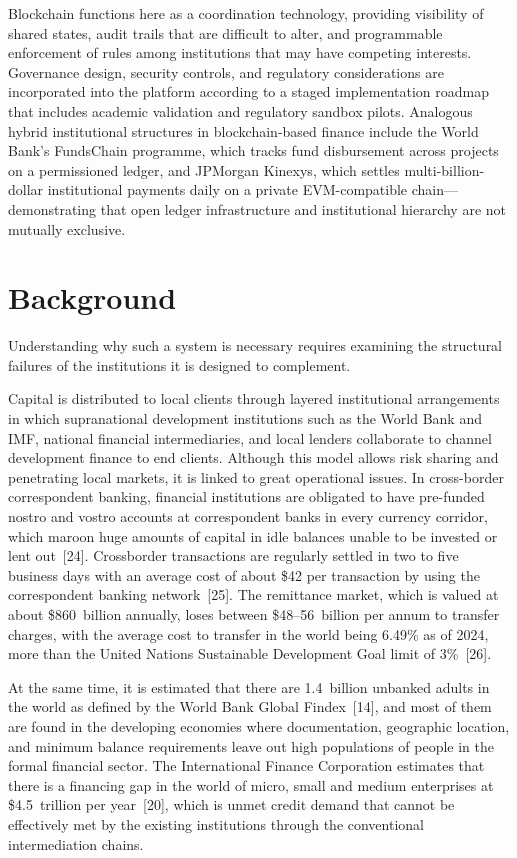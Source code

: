 \documentclass[12pt,a4paper]{report}
\begin{document}
Blockchain functions here as a coordination technology, providing visibility of shared states, audit trails that are difficult to alter, and programmable enforcement of rules among institutions that may have competing interests. Governance design, security controls, and regulatory considerations are incorporated into the platform according to a staged implementation roadmap that includes academic validation and regulatory sandbox pilots. Analogous hybrid institutional structures in blockchain-based finance include the World Bank's FundsChain programme, which tracks fund disbursement across projects on a permissioned ledger, and JPMorgan Kinexys, which settles multi-billion-dollar institutional payments daily on a private EVM-compatible chain---demonstrating that open ledger infrastructure and institutional hierarchy are not mutually exclusive.

\section{Background}

Understanding why such a system is necessary requires examining the structural failures of the institutions it is designed to complement.

Capital is distributed to local clients through layered institutional arrangements in which supranational development institutions such as the World Bank and IMF, national financial intermediaries, and local lenders collaborate to channel development finance to end clients. Although this model allows risk sharing and penetrating local markets, it is linked to great operational issues. In cross-border correspondent banking, financial institutions are obligated to have pre-funded nostro and vostro accounts at correspondent banks in every currency corridor, which maroon huge amounts of capital in idle balances unable to be invested or lent out~[24]. Crossborder transactions are regularly settled in two to five business days with an average cost of about \$42 per transaction by using the correspondent banking network~[25]. The remittance market, which is valued at about \$860~billion annually, loses between \$48--56~billion per annum to transfer charges, with the average cost to transfer in the world being 6.49\% as of 2024, more than the United Nations Sustainable Development Goal limit of 3\%~[26].

At the same time, it is estimated that there are 1.4~billion unbanked adults in the world as defined by the World Bank Global Findex~[14], and most of them are found in the developing economies where documentation, geographic location, and minimum balance requirements leave out high populations of people in the formal financial sector. The International Finance Corporation estimates that there is a financing gap in the world of micro, small and medium enterprises at \$4.5~trillion per year~[20], which is unmet credit demand that cannot be effectively met by the existing institutions through the conventional intermediation chains.
\end{document}
